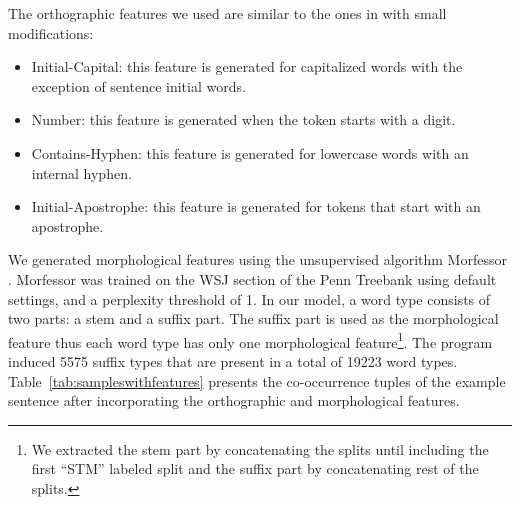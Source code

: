 

The orthographic features we used are similar to the ones in
\cite{bergkirkpatrick-EtAl:2010:NAACLHLT} with small modifications:

\begin{itemize}
\item Initial-Capital: this feature is generated for capitalized words
  with the exception of sentence initial words.
\item Number: this feature is generated when the token starts with a
  digit.
\item Contains-Hyphen: this feature is generated for lowercase words
  with an internal hyphen.
\item Initial-Apostrophe: this feature is generated for tokens that
  start with an apostrophe.
\end{itemize}

We generated morphological features using the unsupervised algorithm
Morfessor \cite{creutz05}.  Morfessor was trained on the WSJ section
of the Penn Treebank using default settings, and a perplexity
threshold of 1.  In our model, a word type consists of two parts: a
stem and a suffix part.  The suffix part is used as the morphological
feature thus each word type has only one morphological
feature\footnote{We extracted the stem part by concatenating the
  splits until including the first ``STM'' labeled split and the
  suffix part by concatenating rest of the splits.}.  The program
induced 5575 suffix types that are present in a total of 19223 word
types.  Table~\ref{tab:sampleswithfeatures} presents the co-occurrence
tuples of the example sentence after incorporating the orthographic
and morphological features.

